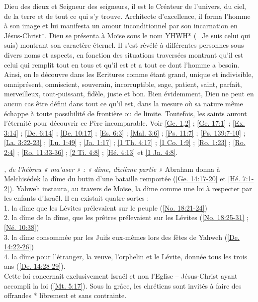 \begin{multicols}{2}
\textit{}\newline
Dieu des dieux et Seigneur des seigneurs, il est le Créateur de l'univers, du ciel, de la terre et de tout ce qui s'y trouve. Architecte d'excellence, il forma l'homme à son image et lui manifesta un amour inconditionnel par son incarnation en Jésus-Christ*. Dieu se présenta à Moïse sous le nom YHWH* (=Je suis celui qui suis) montrant son caractère éternel. Il s'est révélé à différentes personnes sous divers noms et aspects, en fonction des situations traversées montrant qu'il est celui qui remplit tout en tous et qu'il est et a tout ce dont l'homme a besoin. Ainsi, on le découvre dans les Ecritures comme étant grand, unique et indivisible, omniprésent, omniscient, souverain, incorruptible, sage, patient, saint, parfait, merveilleux, tout-puissant, fidèle, juste et bon. Bien évidemment, Dieu ne peut en aucun cas être défini dans tout ce qu'il est, dans la mesure où sa nature même échappe à toute possibilité de frontière ou de limite. Toutefois, les saints auront l'éternité pour découvrir ce Père incomparable. Voir \vref{Ge. 1,2} ; \vref{Ge. 17:1} ; \vref{Ex. 3:14} ; \vref{De. 6:14} ; \vref{De. 10:17} ; \vref{Es. 6:3} ; \vref{Mal. 3:6} ; \vref{Ps. 11:7} ; \vref{Ps. 139:7-10} ; \vref{La. 3:22-23} ; \vref{Lu. 1:49} ; \vref{Ja. 1:17} ; \vref{1 Th. 4:17} ; \vref{1 Co. 1:9} ; \vref{Ro. 1:23} ; \vref{Ro. 2:4} ; \vref{Ro. 11:33-36} ; \vref{2 Ti. 4:8} ; \vref{Hé. 4:13} et \vref{1 Jn. 4:8}.

\textit{, de l'hébreu « ma'aser » : « dîme, dixième partie »}\newline
Abraham donna à Melchisédek la dîme du butin d'une bataille remportée (\vref{Ge. 14:17-20} et \vref{Hé. 7:1-2}). Yahweh instaura, au travers de Moïse, la dîme comme une loi à respecter par les enfants d'Israël. Il en existait quatre sortes :
\\1. la dîme que les Lévites prélevaient sur le peuple (\vref{No. 18:21-24})
\\2. la dîme de la dîme, que les prêtres prélevaient sur les Lévites (\vref{No. 18:25-31} ; \vref{Né. 10:38})
\\3. la dîme consommée par les Juifs eux-mêmes lors des fêtes de Yahweh (\vref{De. 14:22-26})
\\4. la dîme pour l'étranger, la veuve, l'orphelin et le Lévite, donnée tous les trois ans (\vref{De. 14:28-29}).
\\Cette loi concernait exclusivement Israël et non l'Eglise – Jésus-Christ ayant accompli la loi (\vref{Mt. 5:17}). Sous la grâce, les chrétiens sont invités à faire des offrandes * librement et sans contrainte.


\end{multicols}
